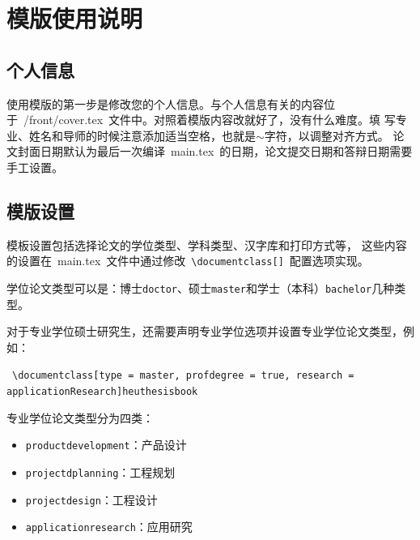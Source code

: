 
%
%
%

\chapter{模版使用说明}
\label{chap03}

\section{个人信息}

使用模版的第一步是修改您的个人信息。与个人信息有关的内容位
于~{/front/cover.tex}~文件中。对照着模版内容改就好了，没有什么难度。填
写专业、姓名和导师的时候注意添加适当空格，也就是$\sim$字符，以调整对齐方式。
论文封面日期默认为最后一次编译~main.tex~的日期，论文提交日期和答辩日期需要手工设置。

\section{模版设置}

模板设置包括选择论文的学位类型、学科类型、汉字库和打印方式等，
这些内容的设置在~main.tex~文件中通过修改~\texttt{\textbackslash documentclass[]}~配置选项实现。

学位论文类型可以是：博士\texttt{doctor}、硕士\texttt{master}和学士（本科）\texttt{bachelor}几种类型。

对于专业学位硕士研究生，还需要声明专业学位选项并设置专业学位论文类型，例如：

~\texttt{\textbackslash documentclass[type = master, profdegree = true, research = applicationResearch]{heuthesisbook}}

专业学位论文类型分为四类：
\begin{itemize}
  \item \texttt{productdevelopment}：产品设计
  \item \texttt{projectdplanning}：工程规划
  \item \texttt{projectdesign}：工程设计
  \item \texttt{applicationresearch}：应用研究
\end{itemize}

